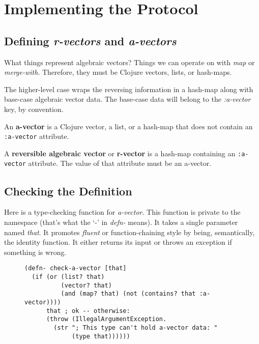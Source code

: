 \documentclass[11pt]{article}
\begin{document}
\section{Implementing the Protocol}
\label{sec-4}

\subsection{Defining \emph{r-vectors} and \emph{a-vectors}}
\label{sec-4-1}

What things represent algebraic vectors?  Things we can operate on
with \emph{map} or \emph{merge-with}.  Therefore, they must be Clojure vectors,
lists, or hash-maps.

The higher-level case wraps the reversing information in a hash-map
along with base-case algebraic vector data. The base-case data will
belong to the \emph{\mbox{:a-vector}} key, by convention.


\begin{mydefinition}
   An \textbf{a-vector} is a Clojure vector, a list, or a hash-map that does not
   contain an \mbox{\texttt{:a-vector}} attribute.
\end{mydefinition}

\begin{mydefinition}
   A \textbf{reversible algebraic vector} or \textbf{r-vector} is a
   hash-map containing an \texttt{:a-vector} attribute. The value of
   that attribute must be an a-vector.
\end{mydefinition}
\subsection{Checking the Definition}
\label{sec-4-2}

Here is a type-checking function for \emph{a-vector}. This function is
private to the namespace (that's what the `-' in \emph{defn-} means).  It
takes a single parameter named \emph{that}. It promotes \emph{fluent} or
function-chaining style by being, semantically, the identity
function. It either returns its input or throws an exception if
something is wrong.

\begin{figure}[H]
\label{check-a-vector}
\begin{verbatim}
(defn- check-a-vector [that]
  (if (or (list? that)
          (vector? that)
          (and (map? that) (not (contains? that :a-vector))))
      that ; ok -- otherwise:
      (throw (IllegalArgumentException.
        (str "; This type can't hold a-vector data: "
             (type that))))))
\end{verbatim}
\end{figure}
\end{document}
